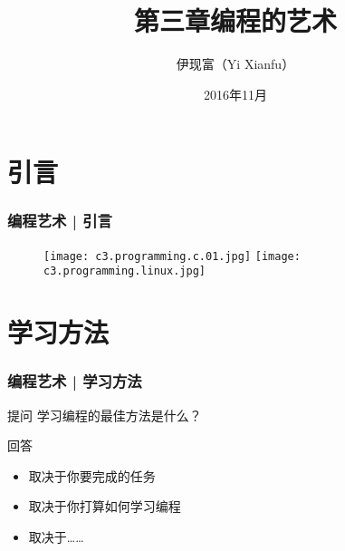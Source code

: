 


\title[编程的艺术]{第三章\quad 编程的艺术}
\author[Yixf]{伊现富（Yi Xianfu）}
\date{2016年11月}



\section{引言}
\begin{frame}
  \frametitle{编程艺术 | 引言}
  \begin{figure}
    \centering
    \texttt{[image: c3.programming.c.01.jpg]}
    \quad
    \texttt{[image: c3.programming.linux.jpg]}
  \end{figure}
\end{frame}

\section{学习方法}
\begin{frame}
  \frametitle{编程艺术 | 学习方法}
  \begin{block}{提问}
 学习编程的最佳方法是什么？ 
  \end{block}
  \pause
  \begin{block}{回答}
    \begin{itemize}
      \item 取决于你要完成的任务
      \item 取决于你打算如何学习编程
      \item 取决于……
    \end{itemize}
  \end{block}
\end{frame}

